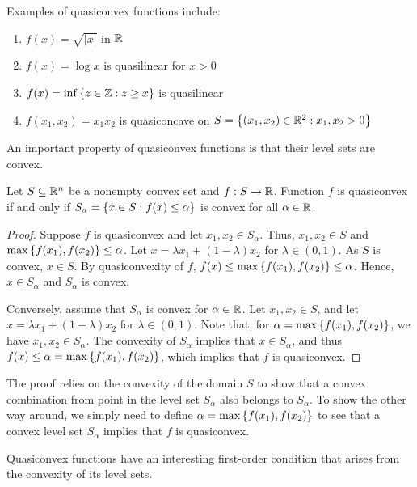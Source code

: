 Examples of quasiconvex functions include:
%
\begin{enumerate}
	\item $f(x) = \sqrt{|x|}$ in $\mathbb{R}$
	\item $f(x) = \log x$ is quasilinear for $x > 0 $ 
	\item $f(x) = \inf\left\{ z \in \mathbb{Z} : z \geq x \right \}$ is quasilinear
	\item $f(x_1,x_2) = x_1x_2$ is quasiconcave on $S = \left\{ (x_1, x_2) \in \mathbb{R}^2 : x_1,x_2 > 0 \right \}$
\end{enumerate}
%
An important property of quasiconvex functions is that their level sets are convex. 
%
\begin{theorem}
	Let $S \subseteq \mathbb{R}^n$ be a nonempty convex set and $f:S \to \mathbb{R}$. Function $f$ is quasiconvex if and only if $S_\alpha = \left\{ x \in S: f(x) \leq \alpha \right \}$ is convex for all $\alpha \in \mathbb{R}$.
\end{theorem}
%
\begin{proof}
	Suppose $f$ is quasiconvex and let $x_1, x_2 \in S_\alpha$. Thus, $x_1, x_2 \in S$ and $\max\left\{ f(x_1), f(x_2) \right \} \leq \alpha$. Let $x = \lambda x_1 + (1-\lambda)x_2$ for $\lambda \in (0,1)$. As $S$ is convex, $x \in S$. By quasiconvexity of $f$, $f(x) \leq \max\left\{ f(x_1), f(x_2) \right \} \leq \alpha$. Hence, $x \in S_\alpha$ and $S_\alpha$ is convex.  

	Conversely, assume that $S_\alpha$ is convex for $\alpha \in \mathbb{R}$. Let $x_1, x_2 \in S$, and let $x = \lambda x_1 + (1-\lambda)x_2$ for $\lambda \in (0,1)$. Note that, for $\alpha = \max\left\{ f(x_1), f(x_2) \right \}$, we have $x_1, x_2 \in S_\alpha$. The convexity of $S_\alpha$ implies that $x \in S_\alpha$, and thus $f(x) \leq \alpha = \max\left\{ f(x_1), f(x_2) \right \}$, which implies that $f$ is quasiconvex.
\end{proof}
 
The proof relies on the convexity of the domain $S$ to show that a convex combination from point in the level set $S_\alpha$ also belongs to $S_\alpha$. To show the other way around, we simply need to define $\alpha = \max\left\{ f(x_1), f(x_2) \right \}$ to see that a convex level set $S_\alpha$ implies that $f$ is quasiconvex. 

Quasiconvex functions have an interesting first-order condition that arises from the convexity of its level sets.

